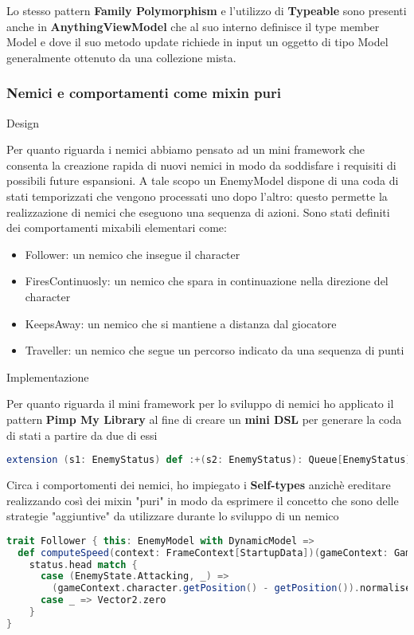 Lo stesso pattern \textbf{Family Polymorphism} e l'utilizzo di \textbf{Typeable} sono presenti anche in \textbf{AnythingViewModel} che al suo interno definisce il type member Model e dove il suo metodo update richiede in input un oggetto di tipo Model generalmente ottenuto da una collezione mista.

\subsubsection{Nemici e comportamenti come mixin puri}
Design

Per quanto riguarda i nemici abbiamo pensato ad un mini framework che consenta la creazione rapida di nuovi nemici in modo da soddisfare i requisiti di possibili future espansioni.
A tale scopo un EnemyModel dispone di una coda di stati temporizzati che vengono processati uno dopo l'altro: questo permette la realizzazione di nemici che eseguono una sequenza di azioni.
Sono stati definiti dei comportamenti mixabili elementari come:
\begin{itemize}
    \item Follower: un nemico che insegue il character
    \item FiresContinuosly: un nemico che spara in continuazione nella direzione del character
    \item KeepsAway: un nemico che si mantiene a distanza dal giocatore
    \item Traveller: un nemico che segue un percorso indicato da una sequenza di punti
\end{itemize}

Implementazione

Per quanto riguarda il mini framework per lo sviluppo di nemici ho applicato il pattern \textbf{Pimp My Library} al fine di creare un \textbf{mini DSL} per generare la coda di stati a partire da due di essi 

\begin{lstlisting}[language=Scala]
extension (s1: EnemyStatus) def :+(s2: EnemyStatus): Queue[EnemyStatus] = Queue(s1, s2)
\end{lstlisting} 

Circa i comportomenti dei nemici, ho impiegato i \textbf{Self-types} anzichè ereditare realizzando così dei mixin "puri" in modo da esprimere il concetto che sono delle strategie "aggiuntive" da utilizzare durante lo sviluppo di un nemico
\begin{lstlisting}[language=Scala]
trait Follower { this: EnemyModel with DynamicModel =>
  def computeSpeed(context: FrameContext[StartupData])(gameContext: GameContext): Vector2 =
    status.head match {
      case (EnemyState.Attacking, _) =>
        (gameContext.character.getPosition() - getPosition()).normalise * MaxSpeed @@ stats
      case _ => Vector2.zero
    }
}
\end{lstlisting} 


